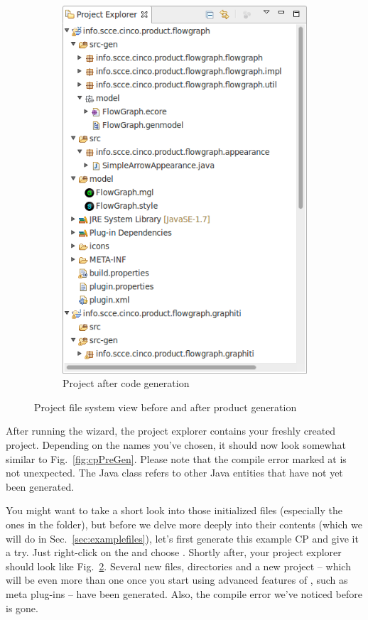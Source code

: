 \documentclass[a4paper,american,12pt]{scrreprt}
\begin{document}
\begin{figure}
\begin{subfigure}[t]{0.40\textwidth}
		\includegraphics[width=\textwidth]{screenshots/example-cp-postgen.png}
		\caption{Project after code generation}
		\label{fig:cpPostGen}
	\end{subfigure}
	\caption{Project file system view before and after \cinco{} product generation}
\end{figure}

After running the wizard, the project explorer contains your freshly created
project. Depending on the names you've chosen, it should now look somewhat
similar to Fig.~\ref{fig:cpPreGen}. Please note that the compile error marked at
 is not unexpected. The Java class refers to
other Java entities that have not yet been generated. 

You might want to take a short look into those initialized files (especially the ones in the
 folder), but before we delve more deeply
into their contents (which we will do
in Sec.~\ref{sec:examplefiles}), let's first generate this example CP and give
it a try. Just right-click on the  and
choose . Shortly after, your project explorer should
look like Fig.~\ref{fig:cpPostGen}. Several new files, directories and a new
project -- which will be even more than one once you start using advanced
features of \cinco{}, such as meta plug-ins -- have been generated. Also, the
compile error we've noticed before is gone. 
\end{document}
